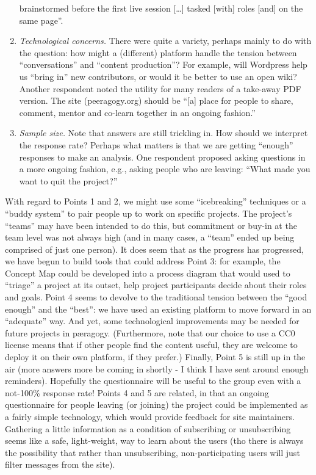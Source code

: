 \begin{enumerate}
  brainstormed before the first live session {[}\ldots{}{]} tasked
  {[}with{]} roles {[}and{]} on the same page''.
\item
  \emph{Technological concerns.} There were quite a variety, perhaps
  mainly to do with the question: how might a (different) platform
  handle the tension between ``conversations'' and ``content
  production''? For example, will Wordpress help us ``bring in'' new
  contributors, or would it be better to use an open wiki? Another
  respondent noted the utility for many readers of a take-away PDF
  version. The site (peeragogy.org) should be ``{[}a{]} place for people
  to share, comment, mentor and co-learn together in an ongoing
  fashion.''
\item
  \emph{Sample size.} Note that answers are still trickling in. How
  should we interpret the response rate? Perhaps what matters is that we
  are getting ``enough'' responses to make an analysis. One respondent
  proposed asking questions in a more ongoing fashion, e.g., asking
  people who are leaving: ``What made you want to quit the project?''
\end{enumerate}
With regard to Points 1 and 2, we might use some ``icebreaking''
techniques or a ``buddy system'' to pair people up to work on specific
projects. The project's ``teams'' may have been intended to do this, but
commitment or buy-in at the team level was not always high (and in many
cases, a ``team'' ended up being comprised of just one person). It does
seem that as the progress has progressed, we have begun to build tools
that could address Point 3: for example, the Concept Map could be
developed into a process diagram that would used to ``triage'' a project
at its outset, help project participants decide about their roles and
goals. Point 4 seems to devolve to the traditional tension between the
``good enough'' and the ``best'': we have used an existing platform to
move forward in an ``adequate'' way. And yet, some technological
improvements may be needed for future projects in pæragogy.
(Furthermore, note that our choice to use a CC0 license means that if
other people find the content useful, they are welcome to deploy it on
their own platform, if they prefer.) Finally, Point 5 is still up in the
air (more answers more be coming in shortly - I think I have sent around
enough reminders). Hopefully the questionnaire will be useful to the
group even with a not-100\% response rate! Points 4 and 5 are related,
in that an ongoing questionnaire for people leaving (or joining) the
project could be implemented as a fairly simple technology, which would
provide feedback for site maintainers. Gathering a little information as
a condition of subscribing or unsubscribing seems like a safe,
light-weight, way to learn about the users (tho there is always the
possibility that rather than unsubscribing, non-participating users will
just filter messages from the site).

